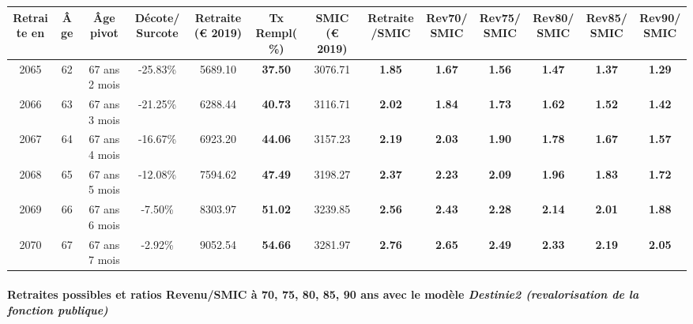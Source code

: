 { \scriptsize \begin{center} 
\begin{tabular}[htb]{|c|c||c|c||c|c||c||c|c|c|c|c|c|} 
\hline 
 Retraite en &  Âge &  Âge pivot &  Décote/Surcote &  Retraite (\euro{} 2019) &  Tx Rempl(\%) &  SMIC (\euro{} 2019) &  Retraite/SMIC &  Rev70/SMIC &  Rev75/SMIC &  Rev80/SMIC &  Rev85/SMIC &  Rev90/SMIC \\ 
\hline \hline 
 2065 &  62 &  67 ans 2 mois &  -25.83\% &  5689.10 &  {\bf 37.50} &  3076.71 &  {\bf 1.85} &  {\bf 1.67} &  {\bf 1.56} &  {\bf 1.47} &  {\bf 1.37} &  {\bf 1.29} \\ 
\hline 
 2066 &  63 &  67 ans 3 mois &  -21.25\% &  6288.44 &  {\bf 40.73} &  3116.71 &  {\bf 2.02} &  {\bf 1.84} &  {\bf 1.73} &  {\bf 1.62} &  {\bf 1.52} &  {\bf 1.42} \\ 
\hline 
 2067 &  64 &  67 ans 4 mois &  -16.67\% &  6923.20 &  {\bf 44.06} &  3157.23 &  {\bf 2.19} &  {\bf 2.03} &  {\bf 1.90} &  {\bf 1.78} &  {\bf 1.67} &  {\bf 1.57} \\ 
\hline 
 2068 &  65 &  67 ans 5 mois &  -12.08\% &  7594.62 &  {\bf 47.49} &  3198.27 &  {\bf 2.37} &  {\bf 2.23} &  {\bf 2.09} &  {\bf 1.96} &  {\bf 1.83} &  {\bf 1.72} \\ 
\hline 
 2069 &  66 &  67 ans 6 mois &  -7.50\% &  8303.97 &  {\bf 51.02} &  3239.85 &  {\bf 2.56} &  {\bf 2.43} &  {\bf 2.28} &  {\bf 2.14} &  {\bf 2.01} &  {\bf 1.88} \\ 
\hline 
 2070 &  67 &  67 ans 7 mois &  -2.92\% &  9052.54 &  {\bf 54.66} &  3281.97 &  {\bf 2.76} &  {\bf 2.65} &  {\bf 2.49} &  {\bf 2.33} &  {\bf 2.19} &  {\bf 2.05} \\ 
\hline 
\hline 
\end{tabular} 
\end{center} } 
\paragraph{Retraites possibles et ratios Revenu/SMIC à 70, 75, 80, 85, 90 ans avec le modèle \emph{Destinie2 (revalorisation de la fonction publique)}}  
 
